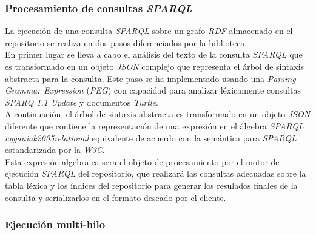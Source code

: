 \subsubsection{Procesamiento de consultas \textit{SPARQL}}

La ejecuci\'on de una consulta \textit{SPARQL} sobre un grafo \textit{RDF} almacenado en el repositorio se realiza en dos pasos diferenciados por la biblioteca.\\
En primer lugar se lleva a cabo el an\'alisis del texto de la consulta \textit{SPARQL} que es transformado en un objeto \textit{JSON} complejo que representa el \'arbol de sintaxis abstracta para la consulta. Este paso se ha implementado usando una \textit{Parsing Grammar Expression} (\textit{PEG}) \cite{pegs} con capacidad para analizar l\'exicamente consultas \textit{SPARQ 1.1 Update} y documentos \textit{Turtle}.\\
A continuaci\'on, el \'arbol de sintaxis abstracta es transformado en un objeto \textit{JSON} diferente que contiene la representaci\'on de una expresi\'on en el \'algebra \textit{SPARQL} \textit{cyganiak2005relational} equivalente de acuerdo con la sem\'antica para \textit{SPARQL} estandarizada por la \textit{W3C}.\\
Esta expresi\'on algebraica sera el objeto de procesamiento por el motor de ejecuci\'on \textit{SPARQL} del repositorio, que realizar\'a las consultas adecuadas sobre la tabla l\'exica y los \'indices del repositorio para generar los resulados finales de la consulta y serializarlos en el formato deseado por el cliente.

\subsubsection{Ejecuci\'on multi-hilo}

